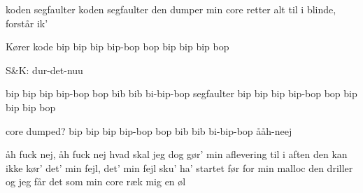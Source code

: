 \documentclass[a4paper,11pt]{article}
\begin{document}
\begin{song}
%
koden segfaulter
koden segfaulter
den dumper min core
%
retter alt til i blinde, forstår ik’

%
Kører kode
bip bip bip bip-bop bop bip bip bip bop

%
S&K: dur-det-nuu

%
bip bip bip bip-bop bop bib bib bi-bip-bop
segfaulter
bip bip bip bip-bop bop bip bip bip bop

%
core dumped?
%
bip bip bip bip-bop bop bib bib bi-bip-bop
%
ååh-neej


%
åh fuck nej, åh fuck nej
hvad skal jeg dog gør’
min aflevering til i aften 
den kan ikke kør’
det’ min fejl, det’ min fejl
sku’ ha’ startet før
for min malloc den driller
og jeg får det som min core
ræk mig en øl 


\end{song}
\end{document}
